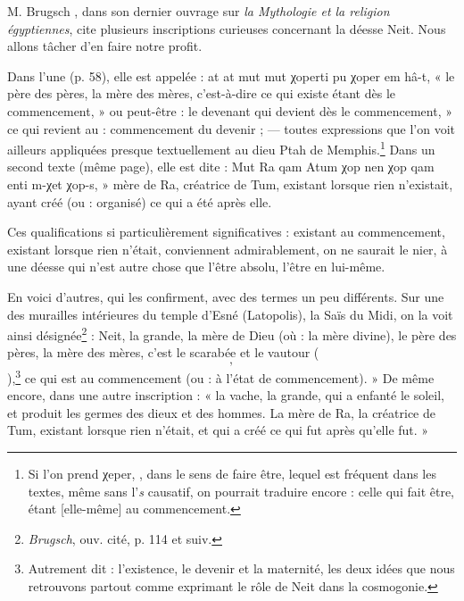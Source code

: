 \documentclass[letterpaper,twocolumn,openany,nodeprecatedcode]{dndbook}
\newcommand*\hieroAAKO{}
\newcommand*\hieroAAXY{}
\begin{document}
M. Brugsch , dans son dernier ouvrage sur \emph{la Mythologie et la religion égyptiennes}, cite plusieurs inscriptions curieuses concernant la déesse Neit. Nous allons tâcher d'en faire notre profit.

Dans l'une (p. 58), elle est appelée : at at mut mut χoperti pu χoper em hâ-t, « le père des pères, la mère des mères, c'est-à-dire ce qui existe étant dès le commencement, » ou peut-être : le devenant qui devient dès le commencement, » ce qui revient au : commencement du devenir ; --- toutes expressions que l'on voit ailleurs appliquées presque textuellement au dieu Ptah de Memphis.\footnote{Si l'on prend χeper, $\hieroAAXY$, dans le sens de faire être, lequel est fréquent dans les textes, même sans l'\emph{s} causatif, on pourrait traduire encore : celle qui fait être, étant [elle-même] au commencement.} Dans un second texte (même page), elle est dite : Mut Ra qam Atum χop nen χop qam enti m-χet χop-s, » mère de Ra, créatrice de Tum, existant lorsque rien n'existait, ayant créé (ou : organisé) ce qui a été après elle.

Ces qualifications si particulièrement significatives : existant au commencement, existant lorsque rien n'était, conviennent admirablement, on ne saurait le nier, à une déesse qui n'est autre chose que l'être absolu, l'être en lui-même.

En voici d'autres, qui les confirment, avec des termes un peu différents. Sur une des murailles intérieures du temple d'Esné (Latopolis), la Saïs du Midi, on la voit ainsi désignée\footnote{\emph{Brugsch}, ouv. cité, p. 114 et suiv.} : Neit, la grande, la mère de Dieu (où : la mère divine), le père des pères, la mère des mères, c'est le scarabée et le vautour ($\hieroAAXY$, $\hieroAAKO$),\footnote{Autrement dit : l'existence, le devenir et la maternité, les deux idées que nous retrouvons partout comme exprimant le rôle de Neit dans la cosmogonie.} ce qui est au commencement (ou : à l'état de commencement). » De même encore, dans une autre inscription : « la vache, la grande, qui a enfanté le soleil, et produit les germes des dieux et des hommes. La mère de Ra, la créatrice de Tum, existant lorsque rien n'était, et qui a créé ce qui fut après qu'elle fut. »
\end{document}
